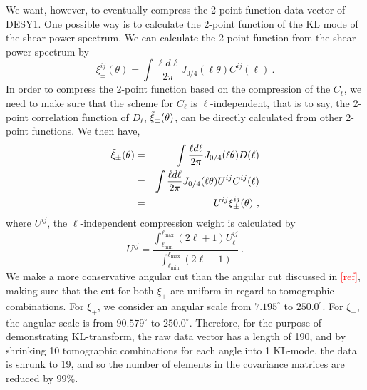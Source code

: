 \documentclass[twocolumn]{\docclass}
\newcommand\be{\begin{equation}}
\newcommand\ee{\end{equation}}
\def\bea{\begin{eqnarray}}
\def\eea{\end{eqnarray}}
\def\svs{\nonumber\\}
\begin{document}
	We want, however, to eventually compress the 2-point function data vector of DESY1. One possible way is to calculate the 2-point function of the KL mode of the shear power spectrum. We can calculate the 2-point function from the shear power spectrum by
	\be
	\xi_{\pm}^{ij}(\theta) = \int \frac{\ell d \ell }{2\pi}J_{0/4}(\ell \theta) C^{ij}(\ell)\
	.\ee
	In order to compress the 2-point function based on the compression of the $C_{\ell}$, we need to make sure that the scheme for $C_{\ell}$ is $\ell$-independent, that is to say, the 2-point correlation function of $D_{\ell}$, $\Tilde{\xi}_{\pm}(\theta)$, can be directly calculated from other 2-point functions. We then have,
	\bea
	\nonumber\Tilde{\xi}_{\pm}(\theta) &=& \int \frac{\ell d \ell }{2\pi}J_{0/4}(\ell \theta) D(\ell)\\\nonumber
	&=&\int \frac{\ell d \ell }{2\pi}J_{0/4}(\ell \theta) U^{ij}C^{ij}(\ell)\\
	&=&U^{ij}\xi_{\pm}^{ij}(\theta)\
	,\eea
	where $U^{ij}$, the $\ell$-independent compression weight is calculated by 
	\be
	U^{ij} = \frac{\int_{\ell _{\mathrm{min}}}^{\ell _{\mathrm{max}}} (2 \ell +1) U^{ij}_{\ell}}{\int_{\ell _{\mathrm{min}}}^{\ell _{\mathrm{max}}} (2 \ell +1)}\
	.\ee
	We make a more conservative angular cut than the angular cut discussed in \textcolor{red}{[ref]}, making sure that the cut for both $\xi_{\pm}$ are uniform in regard to tomographic combinations. For $\xi_+$, we consider an angular scale from $7.195^{\circ}$ to $250.0^{\circ}$. For $\xi_-$, the angular scale is from $90.579^{\circ}$ to $250.0^{\circ}$. Therefore, for the purpose of demonstrating KL-transform, the raw data vector has a length of 190, and by shrinking 10 tomographic combinations for each angle into 1 KL-mode, the data is shrunk to 19, and so the number of elements in the covariance matrices are reduced by 99\%.
	
	
\end{document}
